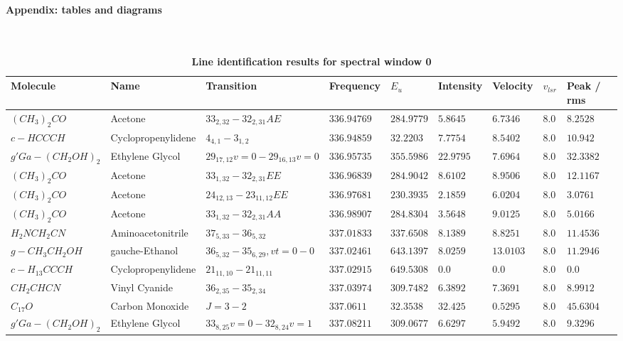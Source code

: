\documentclass[10pt]{article}
\begin{document}
\huge
\textbf{Appendix: tables and diagrams}
\normalsize 
\\
\\
\\
\begin{table}[htb]
\small
     \caption{\textbf{Line identification results for spectral window 0}}
    \centering    
    \begin{tabular}{l l l l l l l l l} 
    \hline    
    Molecule & Name &Transition & Frequency & $E_{u}$ & Intensity & Velocity & $v_{lsr}$ & Peak / rms\\ 
    \hline   
    $(CH_{3})_{2}CO$ & Acetone & $33_{2,32}-32_{2,31}AE$ & $336.94769$ & $284.9779$ & $5.8645$ & $6.7346$ & $8.0$ & $8.2528$\\
    $c-HCCCH$ & Cyclopropenylidene & $4_{4,1}-3_{1,2}$ & $336.94859$ & $32.2203$ & $7.7754$ & $8.5402$ & $8.0$ & $10.942$\\
    $g'Ga-(CH_{2}OH)_{2}$ & Ethylene Glycol & $29_{17,12}v=0-29_{16,13}v=0$ & $336.95735$ & $355.5986$ & $22.9795$ & $7.6964$ & $8.0$ & $32.3382$\\
    $(CH_{3})_{2}CO$ & Acetone & $33_{1,32}-32_{2,31}EE$ & $336.96839$ & $284.9042$ & $8.6102$ & $8.9506$ & $8.0$ & $12.1167$\\
    $(CH_{3})_{2}CO$ & Acetone & $24_{12,13}-23_{11,12}EE$ & $336.97681$ & $230.3935$ & $2.1859$ & $6.0204$ & $8.0$ & $3.0761$\\
    $(CH_{3})_{2}CO$ & Acetone & $33_{1,32}-32_{2,31}AA$ & $336.98907$ & $284.8304$ & $3.5648$ & $9.0125$ & $8.0$ & $5.0166$\\
    $H_{2}NCH_{2}CN$ & Aminoacetonitrile & $37_{5,33}-36_{5,32}$ & $337.01833$ & $337.6508$ & $8.1389$ & $8.8251$ & $8.0$ & $11.4536$\\
    $g-CH_{3}CH_{2}OH$ & gauche-Ethanol & $36_{5,32}-35_{6,29},vt=0-0$ & $337.02461$ & $643.1397$ & $8.0259$ & $13.0103$ & $8.0$ & $11.2946$\\
    $c-H_{13}CCCH$ & Cyclopropenylidene & $21_{11,10}-21_{11,11}$ & $337.02915$ & $649.5308$ & $0.0$ & $0.0$ & $8.0$ & $0.0$\\
    $CH_{2}CHCN$ & Vinyl Cyanide & $36_{2,35}-35_{2,34}$ & $337.03974$ & $309.7482$ & $6.3892$ & $7.3691$ & $8.0$ & $8.9912$\\
    $C_{17}O$ & Carbon Monoxide & $J=3-2$ & $337.0611$ & $32.3538$ & $32.425$ & $0.5295$ & $8.0$ & $45.6304$\\
    $g'Ga-(CH_{2}OH)_{2}$ & Ethylene Glycol & $33_{8,25}v=0-32_{8,24}v=1$ & $337.08211$ & $309.0677$ & $6.6297$ & $5.9492$ & $8.0$ & $9.3296$\\

\end{tabular}
\end{table}
\end{document}
